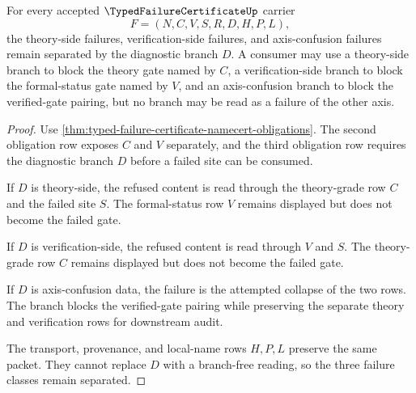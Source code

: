 \begin{theorem}
\label{thm:typed-failure-certificate-axis-separation}
For every accepted $\TypedFailureCertificateUp$ carrier
$$
F=(N,C,V,S,R,D,H,P,L),
$$
the theory-side failures, verification-side failures, and axis-confusion failures remain separated by the diagnostic branch $D$. A consumer may use a theory-side branch to block the theory gate named by $C$, a verification-side branch to block the formal-status gate named by $V$, and an axis-confusion branch to block the verified-gate pairing, but no branch may be read as a failure of the other axis.
\end{theorem}
\begin{proof}
Use \autoref{thm:typed-failure-certificate-namecert-obligations}. The second obligation row exposes $C$ and $V$ separately, and the third obligation row requires the diagnostic branch $D$ before a failed site can be consumed.

If $D$ is theory-side, the refused content is read through the theory-grade row $C$ and the failed site $S$. The formal-status row $V$ remains displayed but does not become the failed gate.

If $D$ is verification-side, the refused content is read through $V$ and $S$. The theory-grade row $C$ remains displayed but does not become the failed gate.

If $D$ is axis-confusion data, the failure is the attempted collapse of the two rows. The branch blocks the verified-gate pairing while preserving the separate theory and verification rows for downstream audit.

The transport, provenance, and local-name rows $H,P,L$ preserve the same packet. They cannot replace $D$ with a branch-free reading, so the three failure classes remain separated.
\end{proof}

